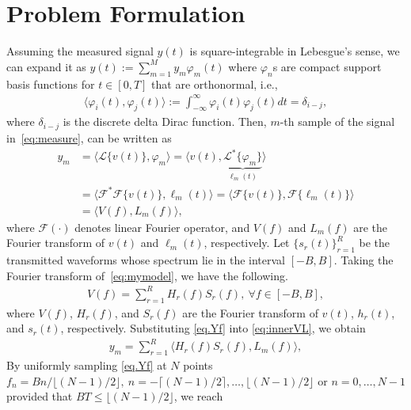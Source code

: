 \documentclass[conference,10pt]{IEEEtran}
\theoremstyle{remark}
\theoremstyle{plain}
\theoremstyle{definition}
\theoremstyle{remark}
\begin{document}
 


 \section{Problem Formulation}\label{sec.model}

Assuming the measured signal $y(t)$ is square-integrable in Lebesgue’s sense, we can expand it as $y(t):=  \sum_{m=1}^M y_m \varphi_m(t)$  where  $\varphi_n$s  are compact support basis functions for $t\in [0, T]$ that are orthonormal, i.e., 
 \begin{align}
    \langle\varphi_i(t), \varphi_j(t) \rangle :=  \int_{-\infty}^{\infty}\varphi_i(t)\varphi_j(t) dt  = \delta_{i-j},     
 \end{align}
 where $\delta_{i-j}$ is the discrete delta Dirac function. Then, $m$-th sample of the signal in~\eqref{eq:measure}, can be written as 
 \begin{align}
    \label{eq:innerVL}
     \nonumber y_m &= \langle \mathcal{L}\{v(t)\}, \varphi_m \rangle = \langle v(t), \underbrace{\mathcal{L}^*\{\varphi_m \}}_{\ell_{m}(t)}\rangle \\ 
     \nonumber & = \langle \mathscr{F}^*\mathscr{F}\{v(t)\}, \ell_{m}(t)\rangle = \langle \mathscr{F}\{v(t)\}, \mathscr{F}\{\ell_{m}(t)\}\rangle \\
     & = \langle V(f), L_m(f)\rangle,
 \end{align}
where $\mathscr{F}(\cdot)$ denotes linear Fourier operator, and $V(f)$ and $L_m(f)$ are the Fourier transform of $v(t)$ and $\ell_m(t)$, respectively. Let $\{s_r(t)\}_{r=1}^R$ be the transmitted waveforms whose spectrum lie in the interval $[-B,B]$. Taking the Fourier transform of~\eqref{eq:mymodel}, we have the following.
 \begin{align} \label{eq.Yf}
V(f)=\sum_{r=1}^{R}H_r(f)S_r(f), ~\forall f\in [-B,B],
 \end{align}   
 where $V(f)$, $H_r(f)$, and $S_r(f)$ are the Fourier transform of $v(t)$, $h_r(t)$, and $s_r(t)$, respectively. Substituting \eqref{eq.Yf} into \eqref{eq:innerVL}, we obtain
  \begin{align}
     \nonumber y_m = \sum_{r=1}^{R} \langle H_r(f)S_r(f), L_m(f)\rangle  ,
 \end{align}
 By uniformly sampling \eqref{eq.Yf} at $N$ points $f_n=Bn/\lfloor (N-1)/2\rfloor,~n= -\lceil (N-1)/2\rceil, \ldots, \lfloor (N-1)/2\rfloor$ or $n=0,\ldots, N-1$ provided that $BT\le \lfloor (N-1)/2\rfloor$, we reach
\end{document}
